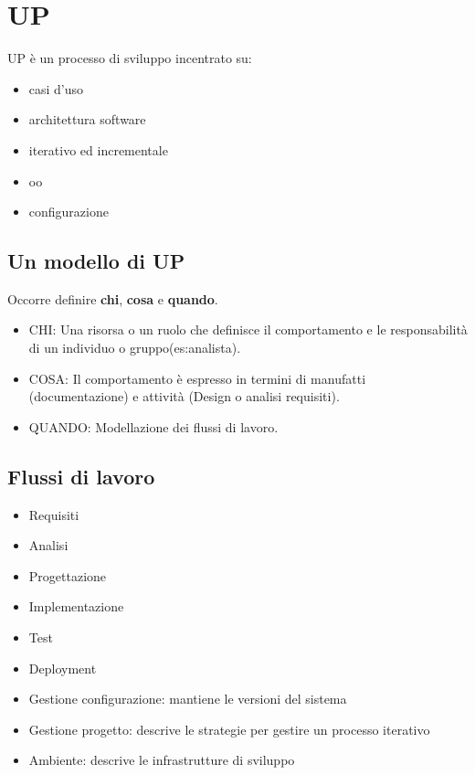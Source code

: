 \documentclass[a4paper,12pt]{report}
\begin{document}
	\section{UP}
	UP è un processo di sviluppo incentrato su: 
	\begin{itemize}
		\item casi d'uso
		\item architettura software
		\item iterativo ed incrementale
		\item oo
		\item configurazione
	\end{itemize}
	\subsection{Un modello di UP}
	Occorre definire \textbf{chi}, \textbf{cosa} e \textbf{quando}.
	\begin{itemize}
		\item CHI: Una risorsa o un ruolo che definisce il comportamento e le responsabilità di un individuo o gruppo(es:analista). 
		\item COSA: Il comportamento è espresso in termini di manufatti (documentazione) e attività (Design o analisi requisiti).
		\item QUANDO: Modellazione dei flussi di lavoro.
	\end{itemize}
	\subsection{Flussi di lavoro}
	\begin{itemize}
		\item Requisiti
		\item Analisi
		\item Progettazione
		\item Implementazione
		\item Test
		\item Deployment
		\item Gestione configurazione: mantiene le versioni del sistema
		\item Gestione progetto: descrive le strategie per gestire un processo iterativo
		\item Ambiente: descrive le infrastrutture di sviluppo
	\end{itemize}
\end{document}
